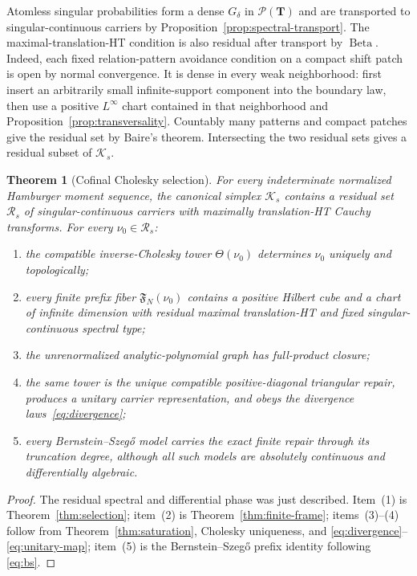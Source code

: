 \documentclass[11pt]{article}
\newtheorem{theorem}{Theorem}[section]
\newcommand{\cK}{\mathcal K}
\newcommand{\cP}{\mathcal P}
\newcommand{\cR}{\mathcal R}
\newcommand{\Beta}{\operatorname{Beta}}
\begin{document}
Atomless singular probabilities form a dense $G_\delta$ in $\cP(\mathbf T)$ and are transported
to singular-continuous carriers by Proposition~\ref{prop:spectral-transport}.  The
maximal-translation-HT condition is also residual after transport by $\Beta$.  Indeed, each fixed
relation-pattern avoidance condition on a compact shift patch is open by normal convergence.  It
is dense in every weak neighborhood: first insert an arbitrarily small infinite-support component
into the boundary law, then use a positive $L^\infty$ chart contained in that neighborhood and
Proposition~\ref{prop:transversality}.  Countably many patterns and compact patches give the
residual set by Baire's theorem.  Intersecting the two residual sets gives a residual subset of
$\cK_s$.

\begin{theorem}[Cofinal Cholesky selection]\label{thm:main}
For every indeterminate normalized Hamburger moment sequence, the canonical simplex $\cK_s$
contains a residual set $\cR_s$ of singular-continuous carriers with maximally translation-HT
Cauchy transforms.  For every $\nu_0\in\cR_s$:
\begin{enumerate}[leftmargin=*,label=\textup{(\arabic*)}]
  \item the compatible inverse-Cholesky tower $\Theta(\nu_0)$ determines $\nu_0$ uniquely and
  topologically;
  \item every finite prefix fiber $\mathfrak F_N(\nu_0)$ contains a positive Hilbert cube and a
  chart of infinite dimension with residual maximal translation-HT and fixed singular-continuous
  spectral type;
  \item the unrenormalized analytic-polynomial graph has full-product closure;
  \item the same tower is the unique compatible positive-diagonal triangular repair, produces a
  unitary carrier representation, and obeys the divergence laws~\eqref{eq:divergence};
  \item every Bernstein--Szeg\H{o} model carries the exact finite repair through its truncation
  degree, although all such models are absolutely continuous and differentially algebraic.
\end{enumerate}
\end{theorem}

\begin{proof}
The residual spectral and differential phase was just described.  Item~(1) is
Theorem~\ref{thm:selection}; item~(2) is Theorem~\ref{thm:finite-frame}; items~(3)--(4) follow
from Theorem~\ref{thm:saturation}, Cholesky uniqueness, and
\eqref{eq:divergence}--\eqref{eq:unitary-map}; item~(5) is the
Bernstein--Szeg\H{o} prefix identity following \eqref{eq:bs}.
\end{proof}
\end{document}
